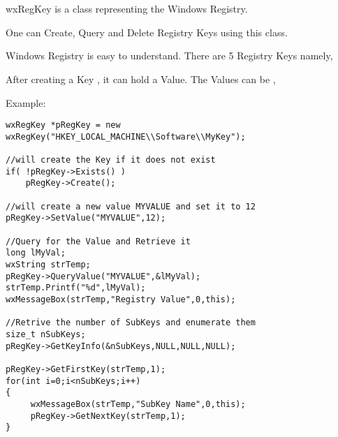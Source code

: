 
\section{}\label{wxregkey}

wxRegKey is a class representing the Windows Registry. 

One can Create, Query and Delete Registry Keys using this class.

Windows Registry is easy to understand. There are 5 Registry Keys namely,

\twocolwidtha{7cm}
\begin{twocollist}\itemsep=0pt
\end{twocollist}

After creating a Key , it can hold a Value. The Values can be ,

\twocolwidtha{7cm}
\begin{twocollist}\itemsep=0pt
\end{twocollist}

Example:
\begin{verbatim}
wxRegKey *pRegKey = new wxRegKey("HKEY_LOCAL_MACHINE\\Software\\MyKey");

//will create the Key if it does not exist
if( !pRegKey->Exists() )
    pRegKey->Create();

//will create a new value MYVALUE and set it to 12
pRegKey->SetValue("MYVALUE",12);

//Query for the Value and Retrieve it
long lMyVal;
wxString strTemp;
pRegKey->QueryValue("MYVALUE",&lMyVal); 
strTemp.Printf("%d",lMyVal);
wxMessageBox(strTemp,"Registry Value",0,this);

//Retrive the number of SubKeys and enumerate them
size_t nSubKeys;
pRegKey->GetKeyInfo(&nSubKeys,NULL,NULL,NULL);

pRegKey->GetFirstKey(strTemp,1);
for(int i=0;i<nSubKeys;i++)
{
     wxMessageBox(strTemp,"SubKey Name",0,this);
     pRegKey->GetNextKey(strTemp,1);
}
\end{verbatim}

